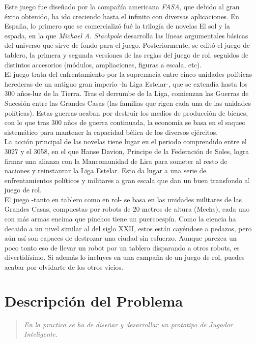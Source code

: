 \documentclass[a4paper,12pt,oneside]{book}
\begin{document}
Este juego fue diseñado por la compañía americana {\it FASA}, que
debido al gran éxito obtenido, ha ido creciendo hasta el infinito con
diversas aplicaciones.
En España, lo primero que se comercializó fué la trilogía de novelas
El sol y la espada, en la que {\it Michael A. Stackpole} desarrolla las
líneas argumentales básicas del universo que sirve de fondo para el
juego. Posteriormente, se editó el juego de tablero, la primera y
segunda versiones de las reglas del juego de rol, seguidos de
distintos accesorios (módulos, ampliaciones, figuras a escala, etc).\\

El juego trata del enfrentamiento por la supremacía entre cinco
unidades políticas herederas de un antiguo gran imperio -la Liga
Estelar-, que se extendía hasta los 300 años-luz de la Tierra. Tras
el derrumbe de la Liga, comienzan las Guerras de Sucesión entre las
Grandes Casas (las familias que rigen cada una de las unidades
políticas). Estas guerras acaban por destruir los medios de producción
de bienes, con lo que tras 300 años de guerra continuada, la economía
se basa en el saqueo sistemático para mantener la capacidad bélica de
los diversos ejércitos.\\


La acción principal de las novelas tiene lugar en el periodo
comprendido entre el 3027 y el 3058, en el que Hanse Davion, Principe
de la Federación de Soles, logra firmar una alianza con la
Mancomunidad de Lira para someter al resto de naciones y reinstaurar
la Liga Estelar. Esto da lugar a una serie de enfrentamientos
políticos y militares a gran escala que dan un buen transfondo al
juego de rol.\\


El juego -tanto en tablero como en rol- se basa en las unidades
militares de las Grandes Casas, compuestas por robots de 20 metros de
altura (Mechs), cada uno con más armas encima que pinchos tiene un
puercoespín. Como la ciencia ha decaido a un nivel similar al del
siglo XXII, estos están cayéndose a pedazos, pero aún así son capaces
de destrozar una ciudad sin esfuerzo. Aunque parezca un poco tonto eso
de llevar un robot por un tablero disparando a otros robots, es
divertidísimo. Si además lo incluyes en una campaña de un juego de
rol, puedes acabar por olvidarte de los otros vicios.


\section{Descripción del Problema}
\begin{quote}
  {\it En la practica se ha de diseñar
    y desarrollar un prototipo de
    Jugador Inteligente. }
\end{quote}
\end{document}
